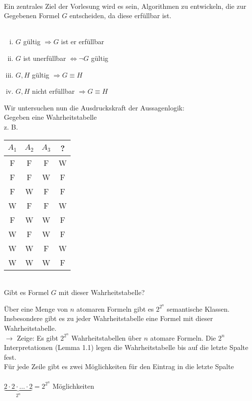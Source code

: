\noindent\\
Ein zentrales Ziel der Vorlesung wird es sein, Algorithmen zu entwickeln, die zur Gegebenen Formel $G$ entscheiden, da diese erfüllbar ist.\\
    
\noindent\\
\bemerkung{}
\begin{enumerate}[i)]
\item $G$ gültig $\Rightarrow G$ ist er erfüllbar
\item $G$ ist unerfüllbar $\Leftrightarrow \neg G$ gültig
\item $G, H$ gültig $\Rightarrow G \equiv H$
\item $G, H$ nicht erfüllbar $\Rightarrow G \equiv H$
\end{enumerate}

\begin{minipage}{\textwidth}
Wir untersuchen nun die Ausdruckskraft der Aussagenlogik:\\
Gegeben eine Wahrheitstabelle\\
z. B.\\
\begin{tabular}{c|c|c|c}
$A_1$ & $A_2$ & $A_3$ & ?\\
\hline
F & F & F & W\\
F & F & W & F\\
F & W & F & F\\
W & F & F & W\\
F & W & W & F\\
W & F & W & F\\
W & W & F & W\\
W & W & W & F
\end{tabular}\\
Gibt es Formel $G$ mit dieser Wahrheitstabelle?
\end{minipage}

Über eine Menge von $n$ atomaren Formeln gibt es $2^{2^{n}}$ semantische Klassen. Insbesondere gibt es zu jeder Wahrheitstabelle eine Formel mit dieser Wahrheitstabelle.\\
    
\beweis{}
$\rightarrow$ Zeige: Es gibt $2^{2^n}$ Wahrheitstabellen über $n$ atomare Formeln. Die $2^n$ Interpretationen (Lemma 1.1) legen die Wahrheitstabelle bis auf die letzte Spalte fest.\\
Für jede Zeile gibt es zwei Möglichkeiten für den Eintrag in die letzte Spalte\\
\noindent\\
$\underbrace{2 \cdot 2 \cdot … \cdot 2}_{2^n} = 2^{2^n}$ Möglichkeiten\\
    

